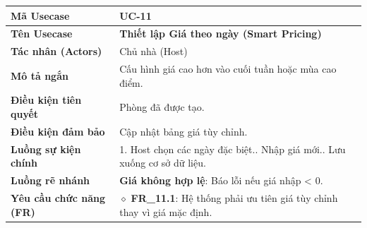 \begin{table}[H]
\renewcommand{\arraystretch}{1.3}
\centering
\begin{tabularx}{\textwidth}{|p{4.5cm}|X|}
\hline
\cellcolor{gray!15}\bfseries Mã Usecase & \textbf{UC-11} \\ \hline
\cellcolor{gray!15}\bfseries Tên Usecase & \textbf{Thiết lập Giá theo ngày (Smart Pricing)} \\ \hline
\cellcolor{gray!15}\bfseries Tác nhân (Actors) & Chủ nhà (Host) \\ \hline
\cellcolor{gray!15}\bfseries Mô tả ngắn & Cấu hình giá cao hơn vào cuối tuần hoặc mùa cao điểm. \\ \hline
\cellcolor{gray!15}\bfseries Điều kiện tiên quyết & Phòng đã được tạo. \\ \hline
\cellcolor{gray!15}\bfseries Điều kiện đảm bảo & Cập nhật bảng giá tùy chỉnh. \\ \hline
\cellcolor{gray!15}\bfseries Luồng sự kiện chính & 1. Host chọn các ngày đặc biệt.\newline 2. Nhập giá mới.\newline 3. Lưu xuống cơ sở dữ liệu. \\ \hline
\cellcolor{gray!15}\bfseries Luồng rẽ nhánh & \textbf{Giá không hợp lệ}: Báo lỗi nếu giá nhập < 0. \\ \hline
\cellcolor{gray!15}\bfseries Yêu cầu chức năng (FR) & $\diamond$ \textbf{FR\_11.1}: Hệ thống phải ưu tiên giá tùy chỉnh thay vì giá mặc định. \\ \hline
\end{tabularx}
\end{table}

